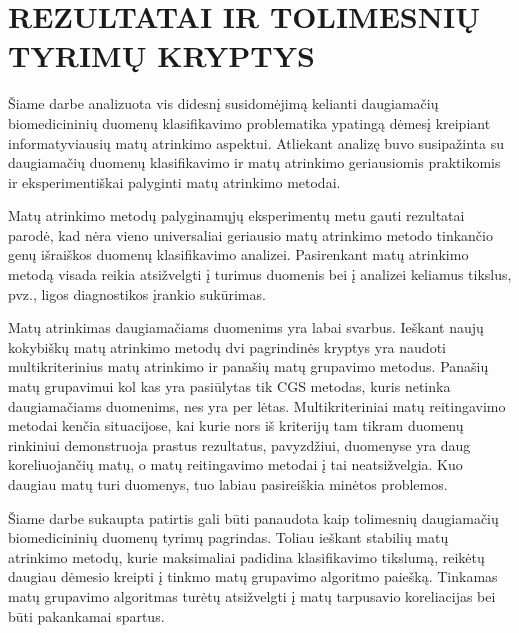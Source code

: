
\section*{REZULTATAI IR TOLIMESNIŲ TYRIMŲ KRYPTYS}
\label{rezultatai_ir_tolimesniu_tyrimu_kryptys}

Šiame darbe analizuota vis didesnį susidomėjimą kelianti daugiamačių biomedicininių duomenų klasifikavimo problematika ypatingą dėmesį kreipiant informatyviausių matų atrinkimo aspektui. Atliekant analizę buvo susipažinta su daugiamačių duomenų klasifikavimo ir matų atrinkimo geriausiomis praktikomis ir eksperimentiškai palyginti matų atrinkimo metodai.

Matų atrinkimo metodų palyginamųjų eksperimentų metu gauti rezultatai parodė, kad nėra vieno universaliai geriausio matų atrinkimo metodo tinkančio genų išraiškos duomenų klasifikavimo analizei. Pasirenkant matų atrinkimo metodą visada reikia atsižvelgti į turimus duomenis bei į analizei keliamus tikslus, pvz., ligos diagnostikos įrankio sukūrimas. 

Matų atrinkimas daugiamačiams duomenims yra labai svarbus. Ieškant naujų kokybiškų matų atrinkimo metodų dvi pagrindinės kryptys yra naudoti multikriterinius matų atrinkimo ir panašių matų grupavimo metodus. Panašių matų grupavimui kol kas yra pasiūlytas tik CGS metodas, kuris netinka daugiamačiams duomenims, nes yra per lėtas. Multikriteriniai matų reitingavimo metodai kenčia situacijose, kai kurie nors iš kriterijų tam tikram duomenų rinkiniui demonstruoja prastus rezultatus, pavyzdžiui, duomenyse yra daug koreliuojančių matų, o matų reitingavimo metodai į tai neatsižvelgia. Kuo daugiau matų turi duomenys, tuo labiau pasireiškia minėtos problemos.

Šiame darbe sukaupta patirtis gali būti panaudota kaip tolimesnių daugiamačių biomedicininių duomenų tyrimų pagrindas. Toliau ieškant stabilių matų atrinkimo metodų, kurie maksimaliai padidina klasifikavimo tikslumą, reikėtų daugiau dėmesio kreipti į tinkmo matų grupavimo algoritmo paiešką. Tinkamas matų grupavimo algoritmas turėtų atsižvelgti į matų tarpusavio koreliacijas bei būti pakankamai spartus.
